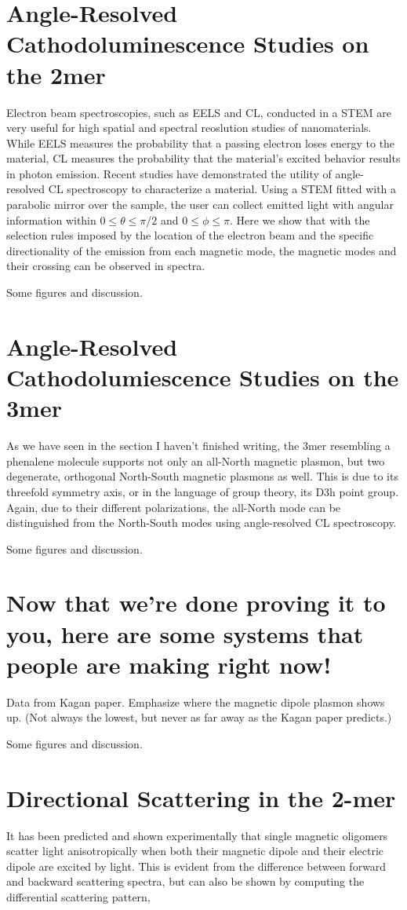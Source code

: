 \documentclass[journal=apchd5,manuscript=article]{achemso}
\begin{document}
\section{Angle-Resolved Cathodoluminescence Studies on the 2mer}
Electron beam spectroscopies, such as EELS and CL, conducted in a STEM are very useful for high spatial and spectral reoslution studies of nanomaterials. While EELS measures the probability that a passing electron loses energy to the material, CL measures the probability that the material's excited behavior results in photon emission. Recent studies have demonstrated the utility of angle-resolved CL spectroscopy to characterize a material. Using a STEM fitted with a parabolic mirror over the sample, the user can collect emitted light with angular information within $0 \leq \theta \leq \pi/2$ and $0 \leq \phi \leq \pi$. Here we show that with the selection rules imposed by the location of the electron beam and the specific directionality of the emission from each magnetic mode, the magnetic modes and their crossing can be observed in spectra.

Some figures and discussion.

\section{Angle-Resolved Cathodolumiescence Studies on the 3mer}
As we have seen in the section I haven't finished writing, the 3mer resembling a phenalene molecule supports not only an all-North magnetic plasmon, but two degenerate, orthogonal North-South magnetic plasmons as well. This is due to its threefold symmetry axis, or in the language of group theory, its D3h point group. Again, due to their different polarizations, the all-North mode can be distinguished from the North-South modes using angle-resolved CL spectroscopy.

Some figures and discussion.

\section{Now that we're done proving it to you, here are some systems that people are making right now!}
Data from Kagan paper. Emphasize where the magnetic dipole plasmon shows up. (Not always the lowest, but never as far away as the Kagan paper predicts.)

Some figures and discussion.

\section{Directional Scattering in the 2-mer}
It has been predicted and shown experimentally that single magnetic oligomers scatter light anisotropically when both their magnetic dipole and their electric dipole are excited by light.\cite{Dionne2011,Cherqui2016} This is evident from the difference between forward and backward scattering spectra, but can also be shown by computing the differential scattering pattern,\cite{jackson_classical_1999,schwinger1998classical}
\end{document}

